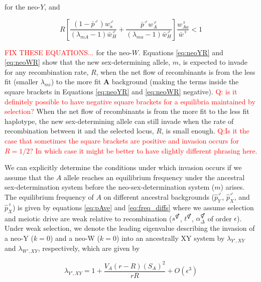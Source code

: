 \documentclass[12pt]{article}
\begin{document}
\noindent
for the neo-$Y$, and 

\noindent
\begin{equation}\label{eq:neoWR}
R \left[  
\frac{(1 - \bar{p}^\male) w^\male_{a}}{(\lambda_{mA}-1)\bar{w}_{H}^{\male}} + 
\frac{\bar{p}^\male w^\male_{A}}{(\lambda_{ma}-1)\bar{w}_{H}^{\male}} \right] 
\frac{w^\female_{Aa}}{\bar{w}^\female} < 1
\end{equation}

\noindent
\textcolor{red}{FIX THESE EQUATIONS...}
for the neo-$W$. Equations \eqref{eq:neoYR} and \eqref{eq:neoWR} show that the new sex-determining allele, $m$, is expected to invade for any recombination rate, $R$, when the net flow of recombinants is from the less fit (smaller $\lambda_{mi}$) to the more fit \textbf{A} background (making the terms inside the square brackets in Equations \ref{eq:neoYR} and \ref{eq:neoWR} negative). \textcolor{red}{Q: is it definitely possible to have negative square brackets for a equilibria maintained by selection?}
When the net flow of recombinants is from the more fit to the less fit haplotype, the new sex-determining allele can still invade when the rate of recombination between it and the selected locus, $R$, is small enough. \textcolor{red}{Q:Is it the case that sometimes the square brackets are positive and invasion occurs for $R=1/2$? In which case it might be better to have slightly different phrasing here.}

We can explicitly determine the conditions under which invasion occurs if we assume that the $A$ allele reaches an equilibrium frequency under the ancestral sex-determination system before the neo-sex-determination system ($m$) arises. 
The equilibrium  frequency of $A$ on different ancestral backgrounds ($\hat{p}^\male_Y$, $\hat{p}^\male_X$, and $\hat{p}^\female_X$) is given by equations \eqref{eq:pAve} and \eqref{eq:freq_diffs} where we assume selection and meiotic drive are weak relative to recombination ($s^\Hermaphrodite$, $t^\Hermaphrodite$, $\alpha_{\Delta}^\Hermaphrodite$ of order $\epsilon$). 
Under weak selection, we denote the leading eigenvalue describing the invasion of a neo-Y ($k=0$) and a neo-W ($k=0$) into an ancestrally XY system by $\lambda_{Y',XY}$ and $\lambda_{W',XY}$, respectively, which are given by

\begin{equation}
\lambda_{Y',XY} =1+ \frac{V_{A} \left( r-R \right)(S_{A})^2 }{r R}+O\left(\epsilon^3 \right) 
\label{eq:lambda_neoY}
\end{equation}
\end{document}
